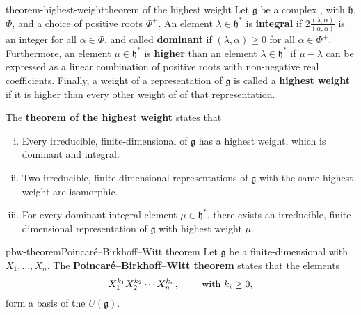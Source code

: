 \begin{topic}{theorem-highest-weight}{theorem of the highest weight}
    Let $\mathfrak{g}$ be a complex , with  $\mathfrak{h}$,  $\Phi$, and a choice of positive roots $\Phi^+$. An element $\lambda \in \mathfrak{h}^*$ is \textbf{integral} if $2 \frac{(\lambda, \alpha)}{(\alpha, \alpha)}$ is an integer for all $\alpha \in \Phi$, and called \textbf{dominant} if $(\lambda, \alpha) \ge 0$ for all $\alpha \in \Phi^+$. Furthermore, an element $\mu \in \mathfrak{h}^*$ is \textbf{higher} than an element $\lambda \in \mathfrak{h}^*$ if $\mu - \lambda$ can be expressed as a linear combination of positive roots with non-negative real coefficients. Finally, a weight of a representation of $\mathfrak{g}$ is called a \textbf{highest weight} if it is higher than every other weight of of that representation.
    
    The \textbf{theorem of the highest weight} states that
    \begin{enumerate}[(i)]
        \item Every irreducible, finite-dimensional  of $\mathfrak{g}$ has a highest weight, which is dominant and integral.
        \item Two irreducible, finite-dimensional representations of $\mathfrak{g}$ with the same highest weight are isomorphic.
        \item For every dominant integral element $\mu \in \mathfrak{h}^*$, there exists an irreducible, finite-dimensional representation of $\mathfrak{g}$ with highest weight $\mu$.
    \end{enumerate}
\end{topic}

\begin{topic}{pbw-theorem}{Poincaré--Birkhoff--Witt theorem}
    Let $\mathfrak{g}$ be a finite-dimensional  with  $X_1, \ldots, X_n$. The \textbf{Poincaré--Birkhoff--Witt theorem} states that the elements
    \[ X_1^{k_1} X_2^{k_2} \cdots X_n^{k_n}, \qquad \textup{ with } k_i \ge 0 ,  \]
    form a basis of the  $U(\mathfrak{g})$.
\end{topic}

